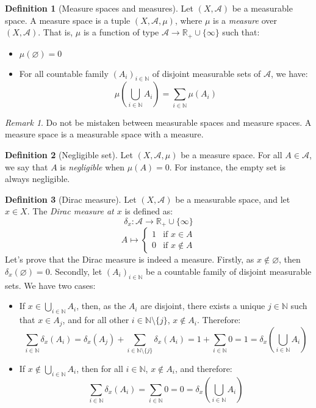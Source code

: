\documentclass{article}
\theoremstyle{definition}
\newtheorem{definition}{Definition}[section]
\theoremstyle{remark}
\newtheorem*{remark}{Remark}
\theoremstyle{example}
\newcommand{\tif}{\text{if }}
\begin{document}
\begin{definition}[Measure spaces and measures]
    Let $(X, \mathcal{A})$ be a measurable space. A measure space is a tuple $(X, \mathcal{A}, \mu)$, where $\mu$ is a \textit{measure} over $(X, \mathcal{A})$. That is, $\mu$ is a function of type $\mathcal{A} \rightarrow \mathbb{R}_+ \cup \{\infty\}$ such that:
    \begin{itemize}
        \item $\mu(\varnothing) = 0$
        \item For all countable family $(A_i)_{i \in \mathbb{N}}$ of disjoint measurable sets of $\mathcal{A}$, we have:
            $$\mu(\bigcup_{i \in \mathbb{N}} A_i) = \sum_{i \in \mathbb{N}} \mu(A_i)$$
    \end{itemize}
\end{definition}

\begin{remark}
    Do not be mistaken between measurable spaces and measure spaces. A measure space is a measurable space with a measure.
\end{remark}

\begin{definition}[Negligible set]
    Let $(X, \mathcal{A}, \mu)$ be a measure space. For all $A \in \mathcal{A}$, we say that $A$ is \textit{negligible} when $\mu(A) = 0$. For instance, the empty set is always negligible.
\end{definition}

\begin{definition}[Dirac measure]
    Let $(X, \mathcal{A})$ be a measurable space, and let $x \in X$. The \textit{Dirac measure at $x$} is defined as:
        $$\delta_x : \mathcal{A} \rightarrow \mathbb{R}_+ \cup \{\infty\}$$
        $$A \mapsto \begin{cases} 1 & \tif x \in A\\ 0 & \tif x \notin A\end{cases}$$
    Let's prove that the Dirac measure is indeed a measure. Firstly, as $x \notin \varnothing$, then $\delta_x(\varnothing) = 0$. Secondly, let $(A_i)_{i \in \mathbb{N}}$ be a countable family of disjoint measurable sets. We have two cases:
    \begin{itemize}
        \item If $x \in \bigcup_{i \in \mathbb{N}} A_i$, then, as the $A_i$ are disjoint, there exists a unique $j \in \mathbb{N}$ such that $x \in A_j$, and for all other $i \in \mathbb{N} \setminus \{j\}$, $x \notin A_i$. Therefore:
            $$\sum_{i \in \mathbb{N}} \delta_x(A_i) = \delta_x(A_j) + \sum_{i \in \mathbb{N} \setminus \{j\}} \delta_x(A_i) = 1 + \sum_{i \in \mathbb{N}} 0 = 1 = \delta_x(\bigcup_{i \in \mathbb{N}} A_i)$$
        \item If $x \notin \bigcup_{i \in \mathbb{N}} A_i$, then for all $i \in \mathbb{N}$, $x \notin A_i$, and therefore:
        $$\sum_{i \in \mathbb{N}} \delta_x(A_i) = \sum_{i \in \mathbb{N}} 0 = 0 = \delta_x(\bigcup_{i \in \mathbb{N}} A_i)$$
    \end{itemize}
\end{definition}
\end{document}
